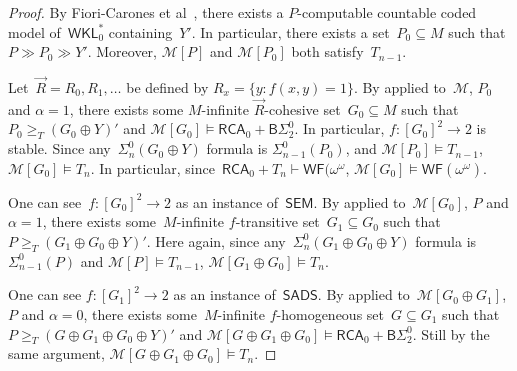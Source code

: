 \documentclass{article}
\numberwithin{theorem}{section}
\newtheorem{proposition}[theorem]{Proposition}
\newcommand{\RCA}{\mathsf{RCA}}
\newcommand{\WKL}{\mathsf{WKL}}
\newcommand{\SEM}{\mathsf{SEM}}
\newcommand{\SADS}{\mathsf{SADS}}
\newcommand{\BSig}{\mathsf{B}\Sigma^0}
\newcommand{\ISig}{\mathsf{I}\Sigma^0}
\newcommand{\WF}{\mathsf{WF}}
\newcommand{\M}{\mathcal{M}}
\begin{document}
\begin{proof}
By Fiori-Carones et al~\cite[Lemma 3.2]{fiori2021isomorphism}, there exists a $P$-computable countable coded model of~$\WKL_0^*$ containing~$Y'$.
In particular, there exists a set~$P_0 \subseteq M$ such that $P \gg P_0 \gg Y'$. Moreover, $\M[P]$ and $\M[P_0]$ both satisfy~$T_{n-1}$.

Let~$\vec{R} = R_0, R_1, \dots$ be defined by $R_x = \{ y : f(x, y) = 1 \}$.
By  applied to~$\M$, $P_0$ and $\alpha = 1$, there exists some $M$-infinite $\vec{R}$-cohesive set~$G_0 \subseteq M$ such that $P_0 \geq_T (G_0 \oplus Y)'$ and $\M[G_0] \models \RCA_0 + \BSig_2$.  In particular, $f : [G_0]^2 \to 2$ is stable.
Since any~$\Sigma^0_n(G_0 \oplus Y)$ formula is $\Sigma^0_{n-1}(P_0)$, and $\M[P_0] \models T_{n-1}$, $\M[G_0] \models T_n$. In particular, since~$\RCA_0 + T_n \vdash \WF(\omega^\omega$, $\M[G_0] \models \WF(\omega^\omega)$.

One can see~$f : [G_0]^2 \to 2$ as an instance of~$\SEM$.
By  applied to~$\M[G_0]$, $P$ and $\alpha = 1$, there exists some~$M$-infinite $f$-transitive set~$G_1 \subseteq G_0$ such that $P \geq_T (G_1 \oplus G_0 \oplus Y)'$.
Here again, since any~$\Sigma^0_n(G_1 \oplus G_0 \oplus Y)$ formula is $\Sigma^0_{n-1}(P)$ and $\M[P] \models T_{n-1}$, $\M[G_1 \oplus G_0] \models T_n$. 

One can see $f : [G_1]^2 \to 2$ as an instance of~$\SADS$.
By  applied to~$\M[G_0 \oplus G_1]$, $P$ and $\alpha = 0$, there exists some~$M$-infinite $f$-homogeneous set~$G \subseteq G_1$ such that $P \geq_T (G \oplus G_1 \oplus G_0 \oplus Y)'$ and $\M[G \oplus G_1 \oplus G_0] \models \RCA_0 + \BSig_2$.
Still by the same argument, $\M[G \oplus G_1 \oplus G_0] \models T_n$.
\end{proof}
\end{document}
